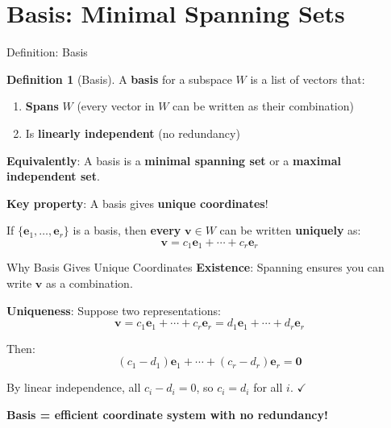 \documentclass[10pt]{beamer}
\theoremstyle{definition}
\newtheorem{defi}{Definition}[section]
\newcommand{\x}[1]{\alert{\textbf{#1}}}
\begin{document}
\section{Basis: Minimal Spanning Sets}

\begin{frame}{Definition: Basis}
\begin{defi}[Basis]
A \x{basis} for a subspace $W$ is a list of vectors that:
\begin{enumerate}
\item \x{Spans} $W$ (every vector in $W$ can be written as their combination)
\item Is \x{linearly independent} (no redundancy)
\end{enumerate}

\textbf{Equivalently}: A basis is a \x{minimal spanning set} or a \x{maximal independent set}.
\end{defi}

\vfill
\x{Key property}: A basis gives \x{unique coordinates}!

If $\{\mathbf{e}_1, \ldots, \mathbf{e}_r\}$ is a basis, then \x{every} $\mathbf{v} \in W$ can be written \x{uniquely} as:
$$\mathbf{v} = c_1\mathbf{e}_1 + \cdots + c_r\mathbf{e}_r$$
\end{frame}

\begin{frame}{Why Basis Gives Unique Coordinates}
\textbf{Existence}: Spanning ensures you can write $\mathbf{v}$ as a combination.

\vfill
\textbf{Uniqueness}: Suppose two representations:
$$\mathbf{v} = c_1\mathbf{e}_1 + \cdots + c_r\mathbf{e}_r = d_1\mathbf{e}_1 + \cdots + d_r\mathbf{e}_r$$

Then:
$$(c_1 - d_1)\mathbf{e}_1 + \cdots + (c_r - d_r)\mathbf{e}_r = \mathbf{0}$$

By linear independence, all $c_i - d_i = 0$, so $c_i = d_i$ for all $i$. $\checkmark$

\vfill
\x{Basis = efficient coordinate system with no redundancy!}
\end{frame}
\end{document}

